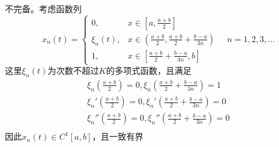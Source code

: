\documentclass[cn]{homework}
\begin{document}
\begin{subproblem}
        \item
        不完备。考虑函数列
        \[x_n(t)=\begin{cases}
            0,&x\in[a,\frac{a+b}{2}]\\
            \xi_n(t),&x\in(\frac{a+b}{2},\frac{a+b}{2}+\frac{b-a}{3n})\\
            1,&x\in[\frac{a+b}{2}+\frac{b-a}{3n},b]
        \end{cases}
        \quad n=1,2,3,\ldots\]
        这里$\xi_n(t)$为次数不超过$K$的多项式函数，且满足
        \[\begin{aligned}
            \xi_n\left(\frac{a+b}{2}\right)=0,
            \xi_n\left(\frac{a+b}{2}+\frac{b-a}{3n}\right)=1\\
            \xi_n'\left(\frac{a+b}{2}\right)=0,
            \xi_n'\left(\frac{a+b}{2}+\frac{b-a}{3n}\right)=0\\
            \xi_n''\left(\frac{a+b}{2}\right)=0,
            \xi_n''\left(\frac{a+b}{2}+\frac{b-a}{3n}\right)=0\\
        \end{aligned}\]
        因此$x_n(t)\in C^1[a,b]$，且一致有界


\end{subproblem}
\end{document}
